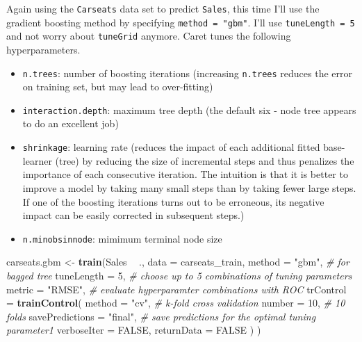 \documentclass[]{book}
\newenvironment{Shaded}{\begin{snugshade}}{\end{snugshade}}
\newcommand{\CommentTok}[1]{\textcolor[rgb]{0.56,0.35,0.01}{\textit{#1}}}
\newcommand{\DataTypeTok}[1]{\textcolor[rgb]{0.13,0.29,0.53}{#1}}
\newcommand{\DecValTok}[1]{\textcolor[rgb]{0.00,0.00,0.81}{#1}}
\newcommand{\KeywordTok}[1]{\textcolor[rgb]{0.13,0.29,0.53}{\textbf{#1}}}
\newcommand{\NormalTok}[1]{#1}
\newcommand{\OperatorTok}[1]{\textcolor[rgb]{0.81,0.36,0.00}{\textbf{#1}}}
\newcommand{\OtherTok}[1]{\textcolor[rgb]{0.56,0.35,0.01}{#1}}
\newcommand{\StringTok}[1]{\textcolor[rgb]{0.31,0.60,0.02}{#1}}
\providecommand{\tightlist}{%
  \setlength{\itemsep}{0pt}\setlength{\parskip}{0pt}}
\begin{document}
Again using the \texttt{Carseats} data set to predict \texttt{Sales}, this time I'll use the gradient boosting method by specifying \texttt{method\ =\ "gbm"}. I'll use \texttt{tuneLength\ =\ 5} and not worry about \texttt{tuneGrid} anymore. Caret tunes the following hyperparameters.

\begin{itemize}
\tightlist
\item
  \texttt{n.trees}: number of boosting iterations (increasing \texttt{n.trees} reduces the error on training set, but may lead to over-fitting)
\item
  \texttt{interaction.depth}: maximum tree depth (the default six - node tree appears to do an excellent job)
\item
  \texttt{shrinkage}: learning rate (reduces the impact of each additional fitted base-learner (tree) by reducing the size of incremental steps and thus penalizes the importance of each consecutive iteration. The intuition is that it is better to improve a model by taking many small steps than by taking fewer large steps. If one of the boosting iterations turns out to be erroneous, its negative impact can be easily corrected in subsequent steps.)
\item
  \texttt{n.minobsinnode}: mimimum terminal node size
\end{itemize}

\begin{Shaded}
\begin{Highlighting}[]
\NormalTok{carseats.gbm <-}\StringTok{ }\KeywordTok{train}\NormalTok{(Sales }\OperatorTok{~}\StringTok{ }\NormalTok{., }
                      \DataTypeTok{data =}\NormalTok{ carseats_train, }
                      \DataTypeTok{method =} \StringTok{"gbm"}\NormalTok{,  }\CommentTok{# for bagged tree}
                      \DataTypeTok{tuneLength =} \DecValTok{5}\NormalTok{,  }\CommentTok{# choose up to 5 combinations of tuning parameters}
                      \DataTypeTok{metric =} \StringTok{"RMSE"}\NormalTok{,  }\CommentTok{# evaluate hyperparamter combinations with ROC}
                      \DataTypeTok{trControl =} \KeywordTok{trainControl}\NormalTok{(}
                        \DataTypeTok{method =} \StringTok{"cv"}\NormalTok{,  }\CommentTok{# k-fold cross validation}
                        \DataTypeTok{number =} \DecValTok{10}\NormalTok{,  }\CommentTok{# 10 folds}
                        \DataTypeTok{savePredictions =} \StringTok{"final"}\NormalTok{,       }\CommentTok{# save predictions for the optimal tuning parameter1}
                        \DataTypeTok{verboseIter =} \OtherTok{FALSE}\NormalTok{,}
                        \DataTypeTok{returnData =} \OtherTok{FALSE}
\NormalTok{                        )}
\NormalTok{                      )}
\end{Highlighting}
\end{Shaded}
\end{document}
